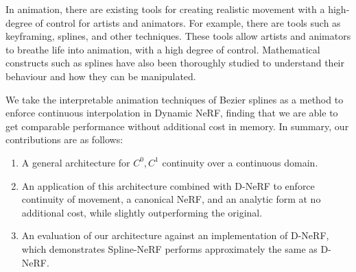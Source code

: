 In animation, there are existing tools for creating realistic movement with a high-degree of
control for artists and animators. For example, there are tools such as keyframing, splines,
and other techniques. These tools allow artists and animators to breathe life into animation,
with a high degree of control. Mathematical constructs such as splines have also been thoroughly
studied to understand their behaviour and how they can be manipulated.

We take the interpretable animation techniques of Bezier splines as a method to enforce continuous interpolation in Dynamic NeRF, finding that we are able to get comparable performance without additional cost in memory.
In summary, our contributions are as follows:

\begin{enumerate}
    \item A general architecture for $C^0, C^1$ continuity over a continuous domain.
    \item An application of this architecture combined with D-NeRF to enforce continuity of movement, a canonical NeRF, and an analytic form at no additional cost, while slightly outperforming the original.
    \item An evaluation of our architecture against an implementation of D-NeRF, which demonstrates Spline-NeRF performs approximately the same as D-NeRF.
\end{enumerate}


